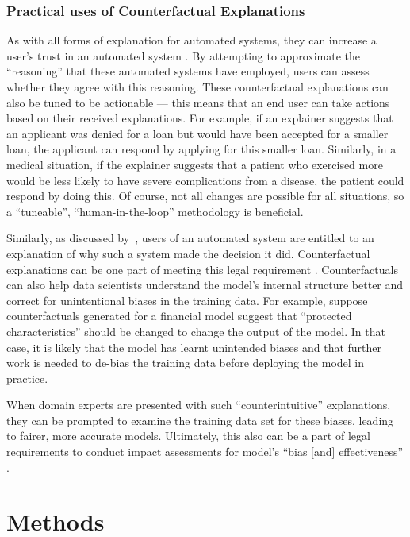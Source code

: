 \documentclass{article}
\begin{document}
\subsubsection{Practical uses of Counterfactual Explanations~\label{sectoin:practical_uses}}
As with all forms of explanation for automated systems, they can increase a user's trust in an automated system \citep{inam_explainable_2021}. 
By attempting to approximate the ``reasoning'' that these automated systems have employed, users can assess whether they agree with this reasoning. These counterfactual explanations can also be tuned to be actionable --- this means that an end user can take actions based on their received explanations. For example, if an explainer suggests that an applicant was denied for a loan but would have been accepted for a smaller loan, the applicant can respond by applying for this smaller loan. Similarly, in a medical situation, if the explainer suggests that a patient who exercised more would be less likely to have severe complications from a disease, the patient could respond by doing this. Of course, not all changes are possible for all situations, so a ``tuneable'', ``human-in-the-loop'' methodology is beneficial.

Similarly, as discussed by~\cite{blackwell_bias_2022}, users of an automated system are entitled to an explanation of why such a system made the decision it did. Counterfactual explanations can be one part of meeting this legal requirement \citep{goodman_european_2017}. 
Counterfactuals can also help data scientists understand the model's internal structure better and correct for unintentional biases in the training data. For example, suppose counterfactuals generated for a financial model suggest that ``protected characteristics'' should be changed to change the output of the model. In that case, it is likely that the model has learnt unintended biases and that further work is needed to de-bias the training data before deploying the model in practice. 

When domain experts are presented with such ``counterintuitive'' explanations, they can be prompted to examine the training data set for these biases, leading to fairer, more accurate models. Ultimately, this also can be a part of legal requirements to conduct impact assessments for model's ``bias [and] effectiveness'' \citep{office_of_ron_wyden_algorithmic_2022}.


\section{Methods}
\end{document}
